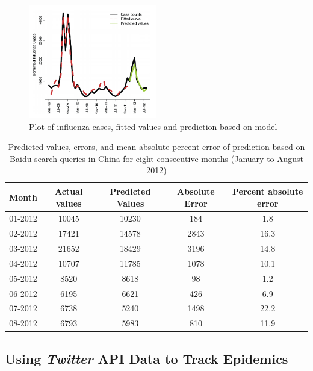 \documentclass[sigconf]{acmart}
\begin{document}
\begin{figure}
  \centering
  \includegraphics[width=0.5\textwidth]{images/Figure2.pdf}
  \caption{Plot of influenza cases, fitted values and prediction based on model \cite{yuan13}} 
  \label{fig:Figure2} 
\end{figure}

\begin{table}
  \caption{Predicted values, errors, and mean absolute percent error of prediction based 
  on Baidu search queries in China for eight consecutive months (January to August 2012) 
  \cite{yuan13}}
  \label{tab:freq}
  \begin{tabular}{ccccc}
    \toprule
     Month&Actual values& Predicted Values& Absolute Error& Percent absolute error\\
    \midrule
    01-2012& 10045& 10230& 184& 1.8\\
    02-2012& 17421& 14578& 2843& 16.3\\
    03-2012& 21652& 18429& 3196& 14.8\\
    04-2012& 10707& 11785& 1078& 10.1\\
    05-2012& 8520& 8618& 98& 1.2\\
    06-2012& 6195& 6621& 426& 6.9\\
    07-2012& 6738& 5240& 1498& 22.2\\
    08-2012& 6793& 5983& 810& 11.9\\
    \bottomrule
  \end{tabular}
\end{table}


\subsection{Using {\itshape Twitter} API Data to Track Epidemics}
\end{document}
